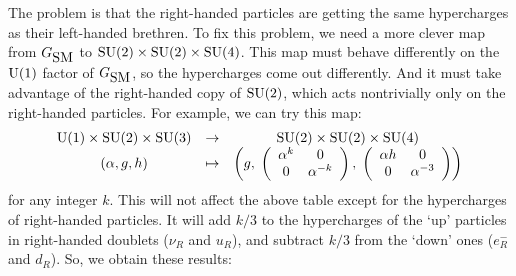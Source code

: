 \documentclass[12pt]{article}
\newcommand{\U}{{\rm U}}    %
\newcommand{\SU}{{\rm SU}}    %
\newcommand{\GSM}{{G_{\mbox{\rm SM}}}}  %
\begin{document}
The problem is that the right-handed particles are getting the
same hypercharges as their left-handed brethren.  
To fix this problem, we need a more clever map from 
$\GSM$ to $\SU(2) \times \SU(2) \times \SU(4)$.  This map must behave
differently on the $\U(1)$ factor of $\GSM$, so the hypercharges
come out differently.  And it must take advantage of the 
right-handed copy of $\SU(2)$, which acts nontrivially only on the
right-handed particles.  For example, we can try this map:
\[ \begin{array}{ccc}
\U(1) \times \SU(2) \times \SU(3) &\to& \SU(2) \times \SU(2) \times \SU(4) \\
  (\alpha, g, h)  &\mapsto&  
\left( g, \;
\left(
\begin{array}{c c}
	\alpha^k & 0 \\
	0 & \alpha^{-k}
\end{array}
\right), \;
\left(
\begin{array}{c c}
	\alpha h & 0 \\
	0 & \alpha^{-3}
\end{array}
\right) 
\right)
\end{array}
\]
for any integer $k$.  This will not affect the above table
except for the hypercharges of right-handed particles.  It will
add $k/3$ to the hypercharges of the `up' particles in right-handed
doublets ($\nu_R$ and $u_R$), and subtract $k/3$ from the `down'
ones ($e^-_R$ and $d_R$).  So, we obtain these results:
\end{document}
